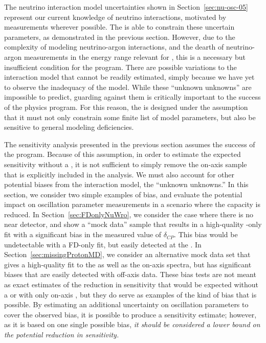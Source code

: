 The neutrino interaction model uncertainties shown in Section~\ref{sec:nu-osc-05} represent our current knowledge of neutrino interactions, motivated by measurements wherever possible. The   is able to constrain these uncertain parameters, as demonstrated in the previous section. However, due to the complexity of modeling neutrino-argon interactions, and the dearth of neutrino-argon measurements in the energy range relevant for , this is a necessary but insufficient condition for the  program. There are possible variations to the interaction model that cannot be readily estimated, simply because we have yet to observe the inadequacy of the model. While these ``unknown unknowns'' are impossible to predict, guarding against them is critically important to the success of the  physics program. For this reason, the  is designed under the assumption that it must not only constrain some finite list of model parameters, but also be sensitive to general modeling deficiencies.

The sensitivity analysis presented in the previous section assumes the success of the  program. Because of this assumption, in order to estimate the expected sensitivity without a , it is not sufficient to simply remove the on-axis   sample that is explicitly included in the analysis. We must also account for other potential biases from the interaction model, the ``unknown unknowns.'' In this section, we consider two simple examples of bias, and evaluate the potential impact on oscillation parameter measurements in a scenario where the  capacity is reduced. In Section~\ref{sec:FDonlyNuWro}, we consider the case where there is no near detector, and show a ``mock data'' sample that results in a high-quality -only fit with a significant bias in the measured value of $\delta_{CP}$. This bias would be undetectable with a FD-only fit, but easily detected at the . In Section~\ref{sec:missingProtonMD}, we consider an alternative mock data set that gives a high-quality fit to the  as well as the on-axis  spectra, but has significant biases that are easily detected with off-axis  data. These bias tests are not meant as exact estimates of the reduction in sensitivity that would be expected without a  or with only on-axis , but they do serve as examples of the kind of bias that is possible. By estimating an additional uncertainty on oscillation parameters to cover the observed bias, it is possible to produce a sensitivity estimate; however, as it is based on one single possible bias, {\em it should be considered a lower bound on the potential reduction in sensitivity.}

